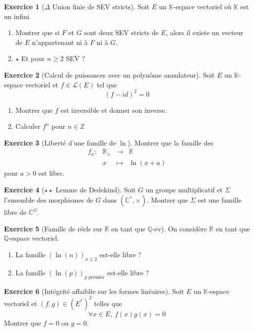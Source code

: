 \documentclass[french]{book}
\newcommand{\Z}{\mathbb{Z}}
\newcommand{\Q}{\mathbb{Q}}
\newcommand{\R}{\mathbb{R}}
\newcommand{\C}{\mathbb{C}}
\newcommand{\K}{\mathbb{K}}
\newcommand{\st}{^*}
\theoremstyle{definition}
\newtheorem{ex}{Exercice}[chapter]
\theoremstyle{theorem}
\theoremstyle{remark}
\begin{document}
\begin{ex}[$\Delta$ Union finie de SEV stricts]
	Soit $E$ un $\K$-espace vectoriel où $\K$ est un infini.
	\begin{enumerate}
		\item Montrer que si $F$ et $G$ sont deux SEV stricts de $E$, alors il existe un vecteur de $E$ n'appartenant ni à $F$ ni à $G$.
		\item $\star$ Et pour $n\geqslant 2$ SEV ?
	\end{enumerate}
\end{ex}

\begin{ex}[Calcul de puissances avec un polynôme annulateur]
	Soit $E$ un $\K$-espace vectoriel et $f\in\mathcal{L}(E)$ tel que $$(f-id)^2=0$$ 
	\begin{enumerate}
		\item Montrer que $f$ est inversible et donner son inverse.
		\item Calculer $f^n$ pour $n \in \Z$
	\end{enumerate}
\end{ex}

\begin{ex}[Liberté d'une famille de $\ln$]
	Montrer que la famille des $$\begin{array}{lrcl}
		f_a:&\R_+&\longrightarrow&\R \\
		&x&\longmapsto&\ln(x+a)
	\end{array}$$ pour $a>0$ est libre.
\end{ex}

\begin{ex}[$\star\star$ Lemme de Dedekind]
	Soit $G$ un groupe multiplicatif et $\Sigma$ l'ensemble des morphismes de $G$ dans $(\C\st,\times)$. Montrer que $\Sigma$ est une famille libre de $\C^G$.
\end{ex}

\begin{ex}[Famille de réels sur $\R$ en tant que $\Q$-ev]
	On considère $\R$ en tant que $\Q$-espace vectoriel.
	\begin{enumerate}
		\item La famille $(\ln(n))_{n\geqslant 2}$ est-elle libre ?
		\item La famille $(\ln(p))_{p\text{ premier}}$ est-elle libre ?
	\end{enumerate}
\end{ex}

\begin{ex}[Intégrité affaiblie sur les formes linéaires]
	Soit $E$ un $\K$-espace vectoriel et $(f,g) \in (E\st)^2$ telles que $$\forall x \in E, \ f(x)g(x)=0$$ Montrer que $f=0$ ou $g=0$.
\end{ex}
\end{document}
